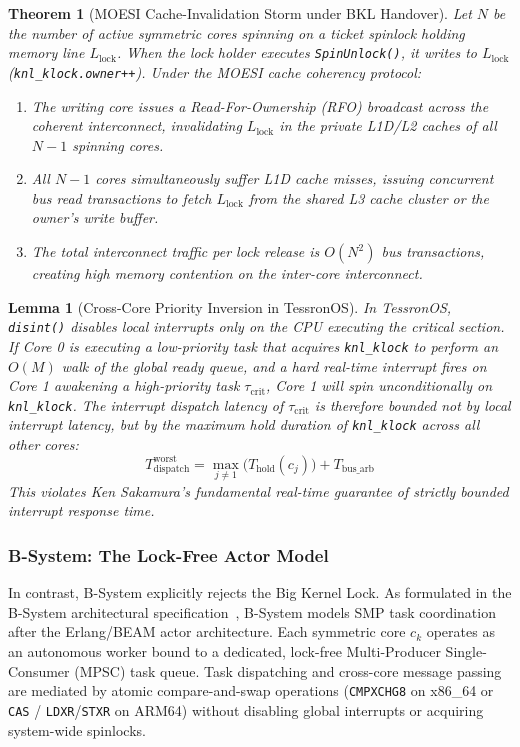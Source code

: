 \documentclass[10pt,journal,compsoc,twocolumn]{article}
\newtheorem{theorem}{Theorem}
\newtheorem{lemma}{Lemma}
\begin{document}
\begin{theorem}[MOESI Cache-Invalidation Storm under BKL Handover]
Let $N$ be the number of active symmetric cores spinning on a ticket spinlock holding memory line $L_{\text{lock}}$. When the lock holder executes \texttt{SpinUnlock()}, it writes to $L_{\text{lock}}$ (\texttt{knl\_klock.owner++}). Under the MOESI cache coherency protocol:
\begin{enumerate}[leftmargin=*]
    \item The writing core issues a Read-For-Ownership (RFO) broadcast across the coherent interconnect, invalidating $L_{\text{lock}}$ in the private L1D/L2 caches of all $N-1$ spinning cores.
    \item All $N-1$ cores simultaneously suffer L1D cache misses, issuing concurrent bus read transactions to fetch $L_{\text{lock}}$ from the shared L3 cache cluster or the owner's write buffer.
    \item The total interconnect traffic per lock release is $O(N^2)$ bus transactions, creating high memory contention on the inter-core interconnect.
\end{enumerate}
\end{theorem}

\begin{lemma}[Cross-Core Priority Inversion in TessronOS]
In TessronOS, \texttt{disint()} disables local interrupts only on the CPU executing the critical section. If Core 0 is executing a low-priority task that acquires \texttt{knl\_klock} to perform an $O(M)$ walk of the global ready queue, and a hard real-time interrupt fires on Core 1 awakening a high-priority task $\tau_{\text{crit}}$, Core 1 will spin unconditionally on \texttt{knl\_klock}. The interrupt dispatch latency of $\tau_{\text{crit}}$ is therefore bounded not by local interrupt latency, but by the maximum hold duration of \texttt{knl\_klock} across all other cores:
\begin{equation}
T_{\text{dispatch}}^{\text{worst}} = \max_{j \ne 1} \bigl(T_{\text{hold}}(c_j)\bigr) + T_{\text{bus\_arb}}
\end{equation}
This violates Ken Sakamura's fundamental real-time guarantee of strictly bounded interrupt response time.
\end{lemma}

\subsubsection{B-System: The Lock-Free Actor Model}
In contrast, B-System explicitly rejects the Big Kernel Lock. As formulated in the B-System architectural specification~\cite{sokhatsky2026btron}, B-System models SMP task coordination after the Erlang/BEAM actor architecture. Each symmetric core $c_k$ operates as an autonomous worker bound to a dedicated, lock-free Multi-Producer Single-Consumer (MPSC) task queue. Task dispatching and cross-core message passing are mediated by atomic compare-and-swap operations (\texttt{CMPXCHG8} on x86\_64 or \texttt{CAS} / \texttt{LDXR}/\texttt{STXR} on ARM64) without disabling global interrupts or acquiring system-wide spinlocks.
\end{document}
